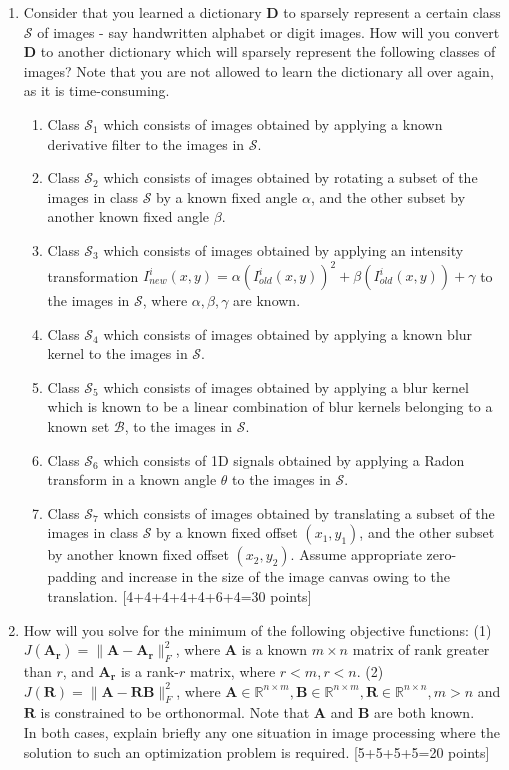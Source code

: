 \documentclass[11pt]{article}
\begin{document}
\begin{enumerate}
\item Consider that you learned a dictionary $\boldsymbol{D}$ to sparsely represent a certain class $\mathcal{S}$ of images - say handwritten alphabet or digit images. How will you convert $\boldsymbol{D}$ to another dictionary which will sparsely represent the following classes of images? Note that you are not allowed to learn the dictionary all over again, as it is time-consuming. 
\begin{enumerate}
\item Class $\mathcal{S}_1$ which consists of images obtained by applying a known derivative filter to the images in $\mathcal{S}$. 
\item Class $\mathcal{S}_2$ which consists of images obtained by rotating a subset of the images in class $\mathcal{S}$ by a known fixed angle $\alpha$, and the other subset by another known fixed angle $\beta$.
\item Class $\mathcal{S}_3$ which consists of images obtained by applying an intensity transformation $I^i_{new}(x,y) = \alpha (I^i_{old}(x,y))^2 + \beta (I^i_{old}(x,y)) + \gamma$ to the images in $\mathcal{S}$, where $\alpha,\beta,\gamma$ are known.  
\item Class $\mathcal{S}_4$ which consists of images obtained by applying a known blur kernel to the images in $\mathcal{S}$. 
\item Class $\mathcal{S}_5$ which consists of images obtained by applying a blur kernel which is known to be a linear combination of blur kernels belonging to a known set $\mathcal{B}$, to the images in $\mathcal{S}$. 
\item Class $\mathcal{S}_6$ which consists of 1D signals obtained by applying a Radon transform in a known angle $\theta$ to the images in $\mathcal{S}$. 
\item Class $\mathcal{S}_7$ which consists of images obtained by translating a subset of the images in class $\mathcal{S}$ by a known fixed offset $(x_1,y_1)$, and the other subset by another known fixed offset $(x_2,y_2)$. Assume appropriate zero-padding and increase in the size of the image canvas owing to the translation.
\textsf{[4+4+4+4+4+6+4=30 points]}
\end{enumerate}

\item How will you solve for the minimum of the following objective functions: (1) $J(\boldsymbol{A_r}) = \|\boldsymbol{A}-\boldsymbol{A_r}\|^2_F$, where $\boldsymbol{A}$ is a known $m \times n$ matrix of rank greater than $r$, and $\boldsymbol{A_r}$ is a rank-$r$ matrix, where $r < m, r < n$. (2) $J(\boldsymbol{R}) = \|\boldsymbol{A}-\boldsymbol{R} \boldsymbol{B}\|^2_F$, where $\boldsymbol{A} \in \mathbb{R}^{n \times m}, \boldsymbol{B} \in \mathbb{R}^{n \times m}, \boldsymbol{R} \in \mathbb{R}^{n \times n}, m > n$ and $\boldsymbol{R}$ is constrained to be orthonormal. Note that $\boldsymbol{A}$ and $\boldsymbol{B}$ are both known. \\
In both cases, explain briefly any one situation in image processing where the solution to such an optimization problem is required. \textsf{[5+5+5+5=20 points]}


\end{enumerate}
\end{document}

